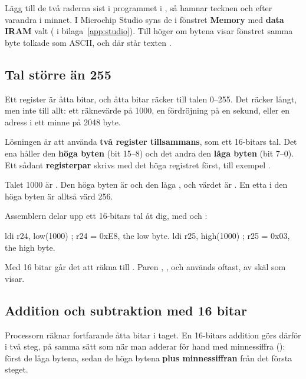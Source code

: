 Lägg till de två raderna sist i programmet i , så hamnar tecknen  och
 efter varandra i minnet. I Microchip Studio syns de i fönstret \textbf{Memory} med
\textbf{data IRAM} valt ( i bilaga~\ref{app:studio}). Till höger om bytena
 visar fönstret samma byte tolkade som ASCII, och där står texten .

\subsection{Tal större än 255}
\label{c10:a6}
Ett register är åtta bitar, och åtta bitar räcker till talen 0--255. Det räcker långt, men inte
till allt: ett räknevärde på 1000, en fördröjning på en sekund, eller en adress i ett minne på
2048 byte.

Lösningen är att använda \textbf{två register tillsammans}, som ett 16-bitars tal. Det ena håller
den \textbf{höga byten} (bit 15--8) och det andra den \textbf{låga byten} (bit 7--0). Ett sådant
\textbf{registerpar} skrivs med det höga registret först, till exempel .


Talet 1000 är . Den höga byten är  och den låga , och värdet är
. En etta i den höga byten är alltså värd 256.

Assemblern delar upp ett 16-bitars tal åt dig, med  och :

\begin{asmcode}
    ldi r24, low(1000)              ; r24 = 0xE8, the low byte.
    ldi r25, high(1000)             ; r25 = 0x03, the high byte.
\end{asmcode}

\noindent Med 16 bitar går det att räkna till \mbox{}. Paren ,
,  och  används oftast, av skäl som 
visar.

\subsection{Addition och subtraktion med 16 bitar}
\label{c10:a7}
Processorn räknar fortfarande åtta bitar i taget. En 16-bitars addition görs därför i två steg, på
samma sätt som när man adderar för hand med minnessiffra (): först de låga bytena,
sedan de höga bytena \textbf{plus minnessiffran} från det första steget.

